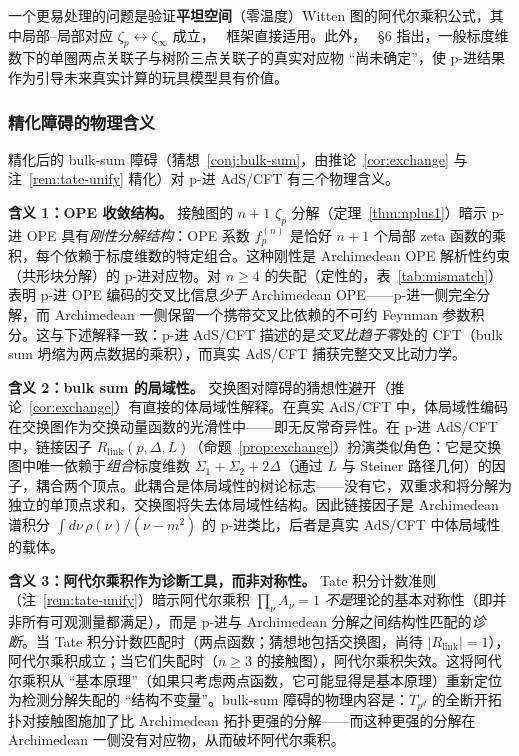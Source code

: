 \documentclass[11pt,a4paper]{ctexart}
\theoremstyle{remark}
\begin{document}
一个更易处理的问题是验证\textbf{平坦空间}（零温度）Witten 图的阿代尔乘积公式，其中局部--局部对应 $\zeta_p \leftrightarrow \zeta_\infty$ 成立，~\cite{HSYZ20} 框架直接适用。此外，~\cite{HJ24} \S6 指出，一般标度维数下的单圈两点关联子与树阶三点关联子的真实对应物 ``尚未确定''，使 p-进结果作为引导未来真实计算的玩具模型具有价值。

\subsubsection{精化障碍的物理含义}
\label{sec:physical-impl}

精化后的 bulk-sum 障碍（猜想~\ref{conj:bulk-sum}，由推论~\ref{cor:exchange} 与注~\ref{rem:tate-unify} 精化）对 p-进 AdS/CFT 有三个物理含义。

\textbf{含义 1：OPE 收敛结构。} 接触图的 $n{+}1$ $\zeta_p$ 分解（定理~\ref{thm:nplus1}）暗示 p-进 OPE 具有\emph{刚性分解结构}：OPE 系数 $f_p^{(n)}$ 是恰好 $n{+}1$ 个局部 zeta 函数的乘积，每个依赖于标度维数的特定组合。这种刚性是 Archimedean OPE 解析性约束（共形块分解）的 p-进对应物。对 $n \geq 4$ 的失配（定性的，表~\ref{tab:mismatch}）表明 p-进 OPE 编码的交叉比信息\emph{少于} Archimedean OPE——p-进一侧完全分解，而 Archimedean 一侧保留一个携带交叉比依赖的不可约 Feynman 参数积分。这与下述解释一致：p-进 AdS/CFT 描述的是\emph{交叉比趋于零}处的 CFT（bulk sum 坍缩为两点数据的乘积），而真实 AdS/CFT 捕获完整交叉比动力学。

\textbf{含义 2：bulk sum 的局域性。} 交换图对障碍的猜想性避开（推论~\ref{cor:exchange}）有直接的体局域性解释。在真实 AdS/CFT 中，体局域性编码在交换图作为交换动量函数的光滑性中——即无反常奇异性。在 p-进 AdS/CFT 中，链接因子 $R_{\mathrm{link}}(p, \Delta, L)$（命题~\ref{prop:exchange}）扮演类似角色：它是交换图中唯一依赖于\emph{组合}标度维数 $\Sigma_1 + \Sigma_2 + 2\Delta$（通过 $L$ 与 Steiner 路径几何）的因子，耦合两个顶点。此耦合是体局域性的树论标志——没有它，双重求和将分解为独立的单顶点求和，交换图将失去体局域性结构。因此链接因子是 Archimedean 谱积分 $\int d\nu\, \rho(\nu) / (\nu - m^2)$ 的 p-进类比，后者是真实 AdS/CFT 中体局域性的载体。

\textbf{含义 3：阿代尔乘积作为诊断工具，而非对称性。} Tate 积分计数准则（注~\ref{rem:tate-unify}）暗示阿代尔乘积 $\prod_\nu A_\nu = 1$ \emph{不是}理论的基本对称性（即并非所有可观测量都满足），而是 p-进与 Archimedean 分解之间结构性匹配的\emph{诊断}。当 Tate 积分计数匹配时（两点函数；猜想地包括交换图，尚待 $|R_{\mathrm{link}}| = 1$），阿代尔乘积成立；当它们失配时（$n \geq 3$ 的接触图），阿代尔乘积失效。这将阿代尔乘积从 ``基本原理''（如果只考虑两点函数，它可能显得是基本原理）重新定位为检测分解失配的 ``结构不变量''。bulk-sum 障碍的物理内容是：$T_{p^d}$ 的全断开拓扑对接触图施加了比 Archimedean 拓扑更强的分解——而这种更强的分解在 Archimedean 一侧没有对应物，从而破坏阿代尔乘积。
\end{document}
